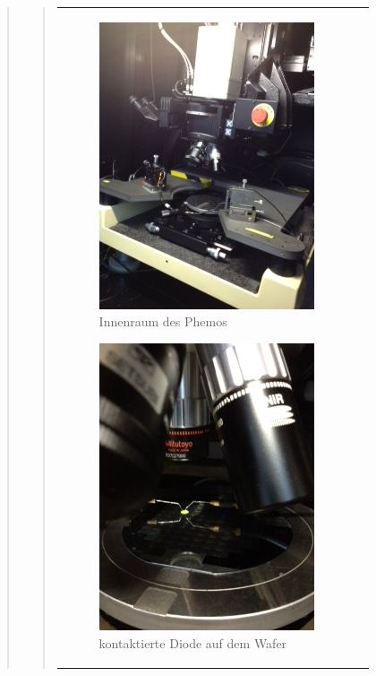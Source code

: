 \begin{quote}
\begin{quote}
\begin{center}
\begin{tabular}{ll}
\begin{minipage}{0.6\textwidth}
                        \begin{figure}[H]
                            \label{fig:}
                            \includegraphics[scale=0.7, trim = 0cm 0cm 0cm
                            0cm, clip]{./Emissionsbilder/restliches/phemos1.JPG}
                            \caption{Innenraum des Phemos}
                        \end{figure}

                    \end{minipage}
                    \begin{minipage}{0.6\textwidth}

                        \begin{figure}[H]
                            \label{fig:adsfgdsfgefgsd}
                            \includegraphics[scale=0.7, trim = 0cm 0cm 0cm
                            0cm, clip]{./Emissionsbilder/restliches/phemos2.JPG}
                            \caption{kontaktierte Diode auf dem Wafer}
                        \end{figure}
                    \vspace{-1.5em}


\end{minipage}
\end{tabular}
\end{center}
\end{quote}
\end{quote}
